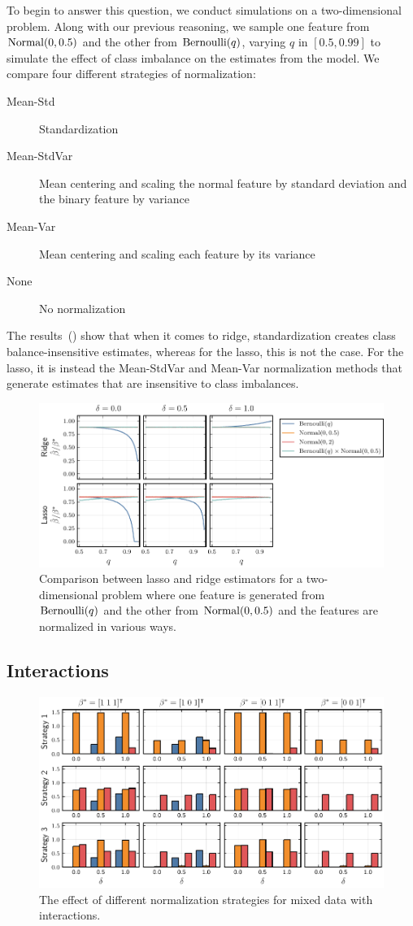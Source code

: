 To begin to answer this question, we conduct simulations on a two-dimensional problem. Along with our previous reasoning, we sample one feature from \(\operatorname{Normal}(0, 0.5)\) and the other from \(\operatorname{Bernoulli}(q)\), varying \(q\) in \([0.5, 0.99]\) to simulate the effect of class imbalance on the estimates from the model. We compare four different strategies of normalization:
\begin{description}
  \item[Mean-Std] Standardization
  \item[Mean-StdVar] Mean centering and scaling the normal feature by standard deviation and the binary feature by variance
  \item[Mean-Var] Mean centering and scaling each feature by its variance
  \item[None] No normalization
\end{description}

The results~() show that when it comes to ridge, standardization creates class balance-insensitive estimates, whereas for the lasso, this is not the case. For the lasso, it is instead the Mean-StdVar and Mean-Var normalization methods that generate estimates that are insensitive to class imbalances.

\begin{figure}[htpb]
  \centering
  \includegraphics{plots/mixed_data.pdf}
  \caption{%
    Comparison between lasso and ridge estimators for a two-dimensional problem where one feature is generated from \(\operatorname{Bernoulli}(q)\) and the other from \(\operatorname{Normal}(0, 0.5)\) and the features are normalized in various ways.}
  \label{fig:lasso-ridge-comparison}
\end{figure}

\subsection{Interactions}

\begin{figure}[htpb]
  \centering
  \includegraphics[]{plots/interactions.pdf}
  \caption{%
    The effect of different normalization strategies for mixed data with interactions.
  }
\end{figure}
